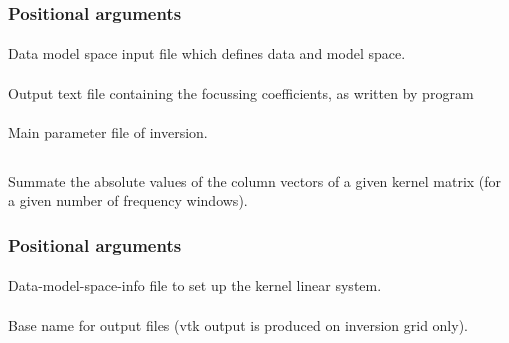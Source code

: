 \subsubsection{Positional arguments}
\paragraph{}
Data model space input file which defines data and model space.
\paragraph{}
Output text file containing the focussing coefficients, as written by program 
\paragraph{}
Main parameter file of inversion.
%
%
\subsection{} \label{programs_scripts,sec:bin_prog,sec:compute_kernel_coverage}
Summate the absolute values of the column vectors of a given kernel matrix (for a given number  of 
frequency windows).
\subsubsection{Positional arguments}
\paragraph{}
Data-model-space-info file to set up the kernel linear system.
\paragraph{}
Base name for output files (vtk output is produced on inversion grid only).
